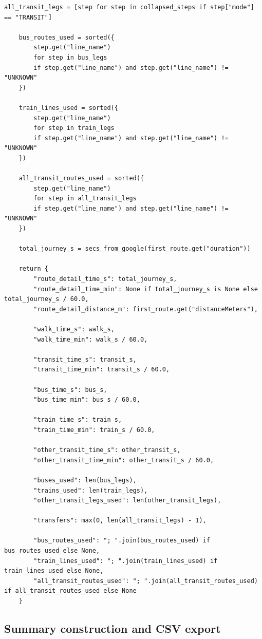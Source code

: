 \documentclass[11pt,a4paper]{article}
\begin{document}
\begin{appendices}
\begin{lstlisting}[style=pythonappendix, caption={Decomposition of route steps into journey-time components}, label={lst:route_decomposition}]
    all_transit_legs = [step for step in collapsed_steps if step["mode"] == "TRANSIT"]

    bus_routes_used = sorted({
        step.get("line_name")
        for step in bus_legs
        if step.get("line_name") and step.get("line_name") != "UNKNOWN"
    })

    train_lines_used = sorted({
        step.get("line_name")
        for step in train_legs
        if step.get("line_name") and step.get("line_name") != "UNKNOWN"
    })

    all_transit_routes_used = sorted({
        step.get("line_name")
        for step in all_transit_legs
        if step.get("line_name") and step.get("line_name") != "UNKNOWN"
    })

    total_journey_s = secs_from_google(first_route.get("duration"))

    return {
        "route_detail_time_s": total_journey_s,
        "route_detail_time_min": None if total_journey_s is None else total_journey_s / 60.0,
        "route_detail_distance_m": first_route.get("distanceMeters"),

        "walk_time_s": walk_s,
        "walk_time_min": walk_s / 60.0,

        "transit_time_s": transit_s,
        "transit_time_min": transit_s / 60.0,

        "bus_time_s": bus_s,
        "bus_time_min": bus_s / 60.0,

        "train_time_s": train_s,
        "train_time_min": train_s / 60.0,

        "other_transit_time_s": other_transit_s,
        "other_transit_time_min": other_transit_s / 60.0,

        "buses_used": len(bus_legs),
        "trains_used": len(train_legs),
        "other_transit_legs_used": len(other_transit_legs),

        "transfers": max(0, len(all_transit_legs) - 1),

        "bus_routes_used": "; ".join(bus_routes_used) if bus_routes_used else None,
        "train_lines_used": "; ".join(train_lines_used) if train_lines_used else None,
        "all_transit_routes_used": "; ".join(all_transit_routes_used) if all_transit_routes_used else None
    }
\end{lstlisting}

\subsection*{Summary construction and CSV export}


\end{appendices}
\end{document}
